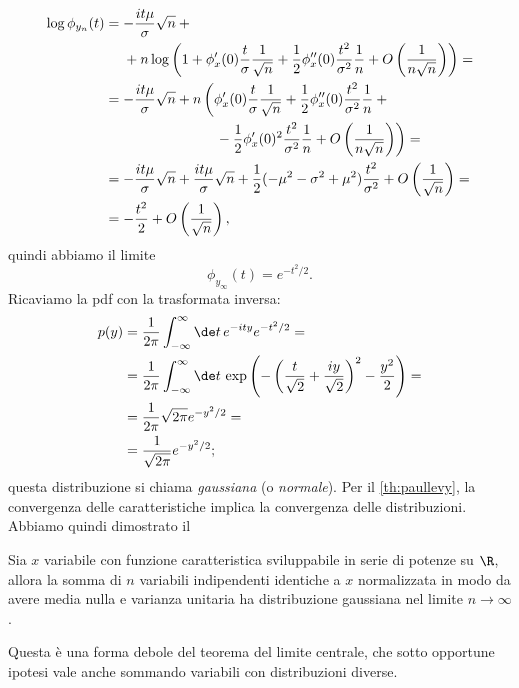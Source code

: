 \begin{align*}
	\log\phi_{y_n}(t)
	&= -\frac{it\mu}{\sigma}\sqrt n + {} \\
	&\phantom{{}={}} + n \log\left(1 + \phi_x'(0) \frac t\sigma \frac1{\sqrt n}
	+ \frac12 \phi_x''(0) \frac{t^2}{\sigma^2} \frac1n
	+ O\left(\frac1{n\sqrt n}\right) \right) = \\
	&= -\frac{it\mu}{\sigma}\sqrt n
	+ n \left( \phi_x'(0) \frac t\sigma \frac1{\sqrt n}
	+ \frac12 \phi_x''(0) \frac{t^2}{\sigma^2} \frac 1n + {}\right. \\
	&\left.\phantom{= -\frac{it\mu}{\sigma}\sqrt n + n\left(\vphantom{\frac1{\sqrt n}}\right.}
	- \frac12 \phi_x'(0)^2 \frac{t^2}{\sigma^2} \frac 1n 
	+ O\left(\frac1{n\sqrt n}\right) \right) = \\
	&= -\frac{it\mu}{\sigma}\sqrt n
	+ \frac{it\mu}{\sigma}\sqrt n
	+ \frac12 (-\mu^2 - \sigma^2 + \mu^2) \frac{t^2}{\sigma^2} + O\left(\frac1{\sqrt n}\right) = \\
	&= -\frac{t^2}2 + O\left(\frac1{\sqrt n}\right),
\end{align*}
quindi abbiamo il limite
\begin{equation*}
	\phi_{y_\infty}(t) = e^{-t^2/2}.
\end{equation*}
Ricaviamo la pdf con la trasformata inversa:
\begin{align*}
	p(y)
	&= \frac1{2\pi} \int_{-\infty}^\infty \de t\, e^{-ity} e^{-t^2/2} = \\
	&= \frac1{2\pi} \int_{-\infty}^\infty \de t\,
	\exp\left( -\left(\frac t{\sqrt 2} + \frac{iy}{\sqrt 2}\right)^2 - \frac{y^2}2 \right) = \\
	&= \frac1{2\pi} \sqrt{2\pi} e^{-y^2/2} = \\
	&= \frac1{\sqrt{2\pi}} e^{-y^2/2};
\end{align*}
questa distribuzione si chiama \emph{gaussiana} (o \emph{normale}).
Per il \autoref{th:paullevy},
la convergenza delle caratteristiche implica la convergenza delle distribuzioni.
Abbiamo quindi dimostrato il
\begin{theorem}
	\label{th:limitecentrale}
	Sia $x$ variabile con funzione caratteristica sviluppabile in serie di potenze su $\R$,
	allora la somma di $n$ variabili indipendenti identiche a $x$ normalizzata in modo da avere media nulla e varianza unitaria ha distribuzione gaussiana nel limite $n\to\infty$.
\end{theorem}
Questa è una forma debole del teorema del limite centrale, che sotto opportune ipotesi vale anche sommando variabili con distribuzioni diverse.

